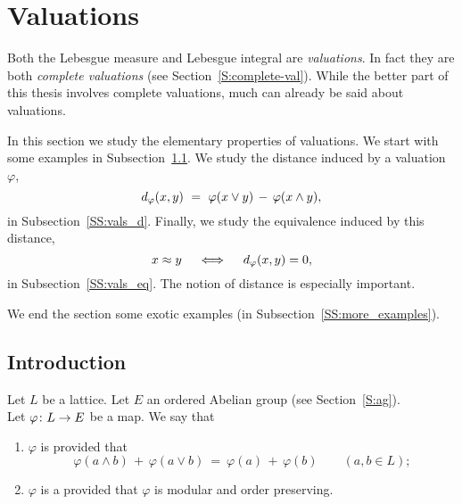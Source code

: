 \documentclass[main.tex]{subfiles}
\begin{document}
\section{Valuations}
\label{S:vals}
\noindent
Both the Lebesgue measure and Lebesgue integral
are \emph{valuations}.
In fact they are both \emph{complete valuations}
(see Section~\ref{S:complete-val}).
While the better part of this thesis involves
complete valuations,
much can already be said about valuations.

In this section we study the elementary properties of valuations.
We start with some examples in Subsection~\ref{SS:vals_intro}.
We study the distance 
induced by a valuation~$\varphi$,
\begin{equation*}
d_{\smash{\varphi}}(x,y) \ =\ \varphi(x\vee y) \,-\, \varphi(x\wedge y),
\end{equation*}
in Subsection~\ref{SS:vals_d}.
Finally, 
we study the equivalence induced by this distance,
\begin{equation*}
x\approx y\quad\iff\quad d_{\smash{\varphi}}(x,y)=0,
\end{equation*}
in Subsection~\ref{SS:vals_eq}.
The notion of distance 
is especially important.

We end the section 
some exotic
examples
(in Subsection~\ref{SS:more_examples}).
\subsection{Introduction}
\label{SS:vals_intro}
\noindent
%
%
\begin{dfn}

\label{D:val}
Let $L$ be a lattice. 
Let $E$ an ordered Abelian group
(see Section~\ref{S:ag}).\\
Let  $\varphi\colon L \rightarrow E$ be a map.
We say that
\begin{enumerate}
\item
\label{D:val-mod}
$\varphi$ is  provided that
\begin{equation*}
\varphi(a\wedge b) \,+\, \varphi(a \vee b)
\ =\ 
\varphi(a) \,+\, \varphi(b)
\qquad(a,b\in L);
\end{equation*}

\item
\label{D:val-val}
$\varphi$ is a 
provided that $\varphi$ is modular and order preserving.
\end{enumerate}
\end{dfn}
\end{document}
